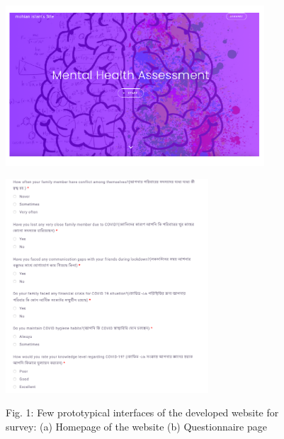 
\begin{figure} [h]
\centering
\begin{minipage}{\textwidth}
  \centering
  \includegraphics[width=\linewidth,height=60mm]{figs/ss_Of_website01.pdf}
  
  \label{fig:knn1}
\end{minipage}%

\subcaption{}

\begin{minipage}{\textwidth}
  \centering
  \includegraphics[width=\textwidth,height=80mm]{figs/ss.png}

  \label{fig:knn1}
\end{minipage}%

\subcaption{}

{Fig. 1: Few prototypical interfaces of the developed website for survey: (a) Homepage of the website (b) Questionnaire page}


\label{fig:prototype}
\end{figure}

